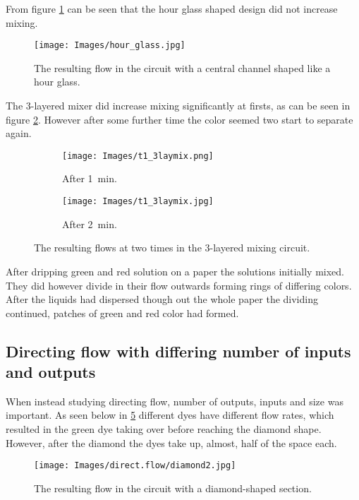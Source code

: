From figure \ref{fig:hourglass} can be seen that the hour glass shaped design did not increase mixing.

\begin{figure}[H]
    \centering
    \texttt{[image: Images/hour\_glass.jpg]}
    \caption{The resulting flow in the circuit with a central channel shaped like a hour glass.}
    \label{fig:hourglass}
\end{figure}

The 3-layered mixer did increase mixing significantly at firsts, as can be seen in figure \ref{fig:sub:3mixt1}. However after some further time the color seemed two start to separate again.

\begin{figure}[H]
\centering
\begin{subfigure}[b]{\subSizeO\textwidth}
  \centering
  \texttt{[image: Images/t1\_3laymix.png]}
  \caption{After \SI{1}{\minute}.}
  \label{fig:sub:3mixt1}
\end{subfigure}%
\begin{subfigure}[b]{\subSizeO \textwidth}
  \centering
  \texttt{[image: Images/t1\_3laymix.jpg]}
  \caption{After \SI{2}{\minute}.}
  \label{fig:sub:3mixt2}
\end{subfigure}
\caption{The resulting flows at two times in the 3-layered mixing circuit.}
\label{fig:y}
\end{figure} 

After dripping green and red solution on a paper the solutions initially mixed. They did however divide in their flow outwards forming rings of differing colors. After the liquids had dispersed though out the whole paper the dividing continued, patches of green and red color had formed.

\subsection{Directing flow with differing number of inputs and outputs}
When instead studying directing flow, number of outputs, inputs and size was important. As seen below in \ref{fig:diamon} different dyes have different flow rates, which resulted in the green dye taking over before reaching the diamond shape. However, after the diamond the dyes take up, almost, half of the space each.

\begin{figure}[H]
    \centering
    \texttt{[image: Images/direct.flow/diamond2.jpg]}
    \caption{The resulting flow in the circuit with a diamond-shaped section.}
    \label{fig:diamon}
\end{figure}
 
